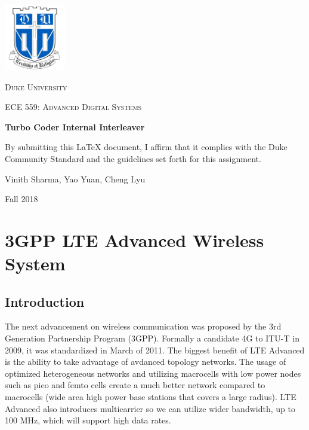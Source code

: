 \documentclass[letterpaper, 12pt]{article} %
\begin{document}
\begin{titlepage}
	\centering
	\includegraphics[width=0.2\textwidth]{files/Duke_logo.png}\par\vspace{1cm}
	{\scshape\LARGE Duke University \par}
	\vspace{1cm}
	{\scshape\Large ECE 559: Advanced Digital Systems \par}
	\vspace{1.5cm}
	{\huge\bfseries Turbo Coder Internal Interleaver \par}
	\vspace{2cm}
   {By submitting this \LaTeX{} document, I affirm that it complies with the Duke Community Standard and the guidelines set forth for this assignment.\par}
   \vspace{1cm}
	{\Large Vinith Sharma, Yao Yuan, Cheng Lyu}
	\vfill
	{\large Fall 2018\par}
\end{titlepage}

\newpage 
\section{3GPP LTE Advanced Wireless System}
    \subsection{Introduction}
        The next advancement on wireless communication was proposed by the 3rd Generation Partnership Program (3GPP). Formally a candidate 4G to ITU-T in 2009, it was standardized in March of 2011.
        The biggest benefit of LTE Advanced is the ability to take advantage of avdanced topology networks. The usage of optimized heterogeneous networks and utilizing macrocells with low power nodes such as pico and femto cells create a much better network compared to macrocells (wide area high power base stations that covers a large radius). LTE Advanced also introduces multicarrier so we can utilize wider bandwidth, up to 100 MHz, which will support high data rates.
        
\end{document}
